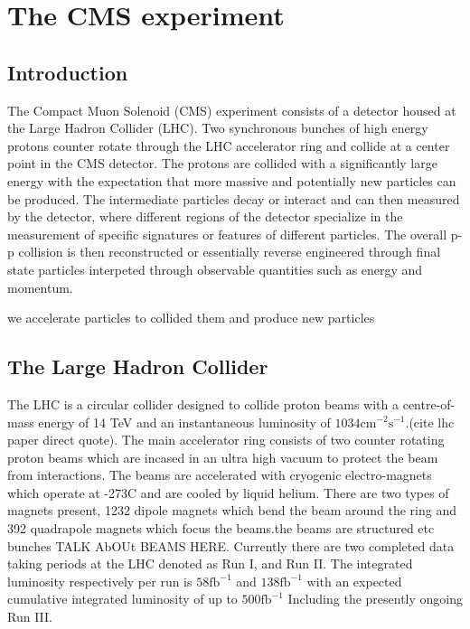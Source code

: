 \setcounter{secnumdepth}{3}
\setcounter{tocdepth}{3}
\setlength{\parskip}{\smallskipamount}
\setlength{\parindent}{0pt}


\makeatletter


\providecommand{\tabularnewline}{\\}


\makeatother


\chapter{The CMS experiment}

\section{Introduction} The Compact Muon Solenoid (CMS) experiment consists of a detector housed at the Large Hadron Collider (LHC). Two synchronous bunches of high energy protons counter rotate through the LHC accelerator ring and collide at a center point in the CMS detector.  The protons are collided with a significantly large energy with the expectation that more massive and potentially new particles can be produced. The intermediate particles decay or interact and can then measured by the detector, where different regions of the detector specialize in the measurement of specific signatures or features of different particles. The overall p-p collision is then reconstructed or essentially reverse engineered through final state particles interpeted through observable quantities such as energy and momentum.   

we accelerate particles to collided them and produce new particles


\section{The Large Hadron Collider}
The LHC is a circular collider designed to collide proton beams with a centre-of-mass energy of 14 TeV and an instantaneous luminosity of $1034 \text{cm}^{-2}\text{s}^{-1}$.(cite lhc paper direct quote). The main accelerator ring consists of two counter rotating proton beams which are incased in an ultra high vacuum to protect the beam from interactions. The beams are accelerated with cryogenic electro-magnets which operate at -273C and are cooled by liquid helium. There are two types of magnets present, 1232 dipole magnets which bend the beam around the ring and 392 quadrapole magnets which focus the beams.the beams are structured etc bunches TALK AbOUt BEAMS HERE. Currently there are two completed data taking periods at the LHC denoted as Run I, and Run II. The integrated luminosity respectively per run is $58\text{fb}^{-1}$ and $138\text{fb}^{-1}$ with an expected cumulative integrated luminosity of up to $500\text{fb}^{-1}$ Including the presently ongoing Run III.  

